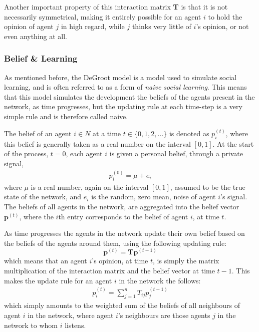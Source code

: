 \documentclass{article}
\begin{document}
Another important property of this interaction matrix \textbf{T} is that it is not necessarily symmetrical, making it entirely possible for an agent $i$ to hold the opinion of agent $j$ in high regard, while $j$ thinks very little of $i$'s opinion, or not even anything  at all.

\newpage

\subsubsection{Belief \& Learning}
As mentioned before, the DeGroot model is a model used to simulate social learning, and is often referred to as a form of \textit{naive social learning}. This means that this model simulates the development the beliefs of the agents present in the network, as time progresses, but the updating rule at each time-step is a very simple rule and is therefore called naive.

The belief of an agent $i \in N$ at a time $t \in \{0, 1, 2, ...\}$ is denoted as $p_{i}^{(t)}$, where this belief is generally taken as a real number on the interval $[0, 1]$. At the start of the process, $t=0$, each agent $i$ is given a personal belief, through a private signal,
\begin{align*}
    p_{i}^{(0)} = \mu + e_i
\end{align*}
where $\mu$ is a real number, again on the interval $[0, 1]$, assumed to be the true state of the network, and $e_i$ is the random, zero mean, noise of agent $i$'s signal. \newline
The beliefs of all agents in the network, are aggregated into the belief vector $\textbf{p}^{(t)}$, where the $i$th entry corresponds to the belief of agent $i$, at time $t$.

As time progresses the agents in the network update their own belief based on the beliefs of the agents around them, using the following updating rule:
\begin{equation}
    \textbf{p}^{(t)} = \textbf{T}\textbf{p}^{(t-1)} \label{updating:standard}
\end{equation}
which means that an agent $i$'s opinion, at time $t$, is simply the matrix multiplication of the interaction matrix and the belief vector at time $t-1$. This makes the update rule for an agent $i$ in the network the follows:
\begin{align*}
    p_{i}^{(t)} = \sum_{j=1}^{n}T_{ij}p_{j}^{(t-1)}
\end{align*}
which simply amounts to the weighted sum of the beliefs of all neighbours of agent $i$ in the network, where agent $i$'s neighbours are those agents $j$ in the network to whom $i$ listens.
\end{document}
